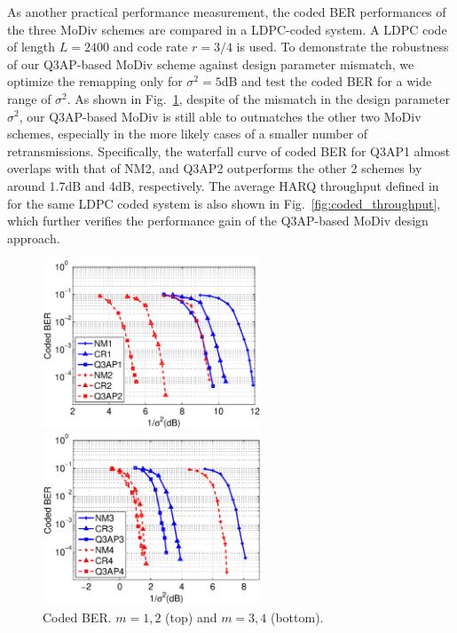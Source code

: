 \documentclass[journal]{IEEEtran}
\begin{document}
As another practical performance measurement, the coded BER performances of
the three MoDiv schemes are compared in a LDPC-coded system. A
LDPC code of length $L=2400$ and code rate $r=3/4$ is used. To demonstrate the
robustness of our Q3AP-based MoDiv scheme against design parameter mismatch, we
optimize the remapping only for $\sigma^2 = 5$dB and test the coded BER for a
wide range of $\sigma^2$. As shown in Fig.~\ref{fig:coded}, despite of the
mismatch in the design parameter $\sigma^2$, our Q3AP-based MoDiv is still able
to outmatches the other two MoDiv schemes, especially in the more likely
cases of a smaller number of retransmissions. 
Specifically, the waterfall curve of coded BER for  Q3AP1
almost overlaps with that of NM2, and Q3AP2 outperforms the other 2 schemes by
around 1.7dB and 4dB, respectively. The average HARQ
throughput defined in~\cite{panasonic2001enhanced} for the same LDPC coded
system is also shown in Fig.~\ref{fig:coded_throughput}, which further verifies
the performance gain of the Q3AP-based MoDiv design approach.
\begin{figure}[!t]
  \centering
  \begin{minipage}[b]{1\columnwidth}
    \centering
    \centerline{\includegraphics[width=6.5cm]{./figs/waterfall_64QAM_12.eps}}
  \end{minipage}
  \hfill
  \begin{minipage}[b]{1\columnwidth}
    \centering
    \centerline{\includegraphics[width=6.5cm]{./figs/waterfall_64QAM_34.eps}}
  \end{minipage}
  \vspace{-10pt}
  \caption{Coded BER. $m=1, 2$ (top) and $m=3,4$ (bottom).}
  \label{fig:coded}
\end{figure}
\end{document}
